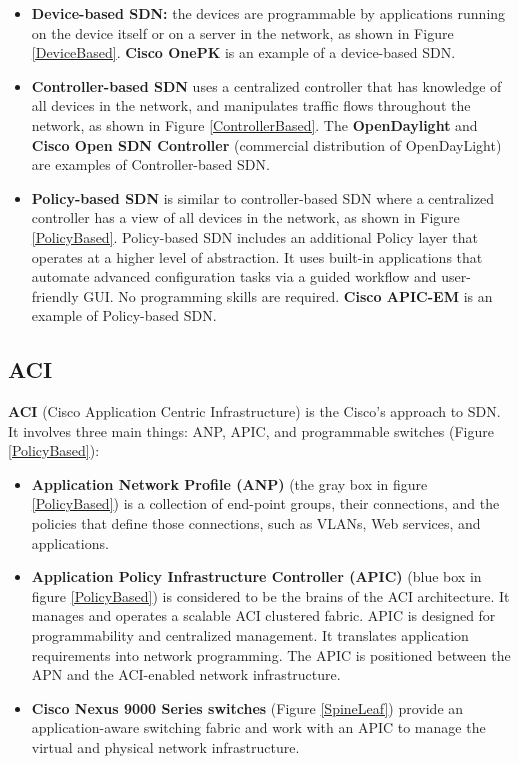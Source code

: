 \begin{itemize}
\item \textbf{Device-based SDN:} the devices are programmable by applications running on the device itself or on a server in the network, as shown in Figure \ref{DeviceBased}. \textbf{Cisco OnePK} is an example of a device-based SDN.

\item \textbf{Controller-based SDN} uses a centralized controller that has knowledge of all devices in the network, and manipulates traffic flows throughout the network, as shown in Figure \ref{ControllerBased}. The \textbf{OpenDaylight} and \textbf{Cisco Open SDN Controller} (commercial distribution of OpenDayLight) are examples of Controller-based SDN.

\item \textbf{Policy-based SDN} is similar to controller-based SDN where a centralized controller has a view of all devices in the network, as shown in Figure \ref{PolicyBased}. Policy-based SDN includes an additional Policy layer that operates at a higher level of abstraction. It uses built-in applications that automate advanced configuration tasks via a guided workflow and user-friendly GUI. No programming skills are required. \textbf{Cisco APIC-EM} is an example of Policy-based SDN.
\end{itemize}

\subsection{ACI}

\textbf{ACI} (Cisco Application Centric Infrastructure) is the Cisco's approach to SDN. It involves three main things: ANP, APIC, and programmable switches (Figure \ref{PolicyBased}):

\begin{itemize}
\item \textbf{Application Network Profile (ANP)} (the gray box in figure \ref{PolicyBased}) is a collection of end-point groups, their connections, and the policies that define those connections, such as VLANs, Web services, and applications.

\item \textbf{Application Policy Infrastructure Controller (APIC)} (blue box in figure \ref{PolicyBased}) is considered to be the brains of the ACI architecture. It manages and operates a scalable ACI clustered fabric. APIC is designed for programmability and centralized management. It translates application requirements  into network programming. The APIC is positioned between the APN and the ACI-enabled network infrastructure. 

\item \textbf{Cisco Nexus 9000 Series switches} (Figure \ref{SpineLeaf}) provide an application-aware switching fabric and work with an APIC to manage the virtual and physical network infrastructure.
\end{itemize}

